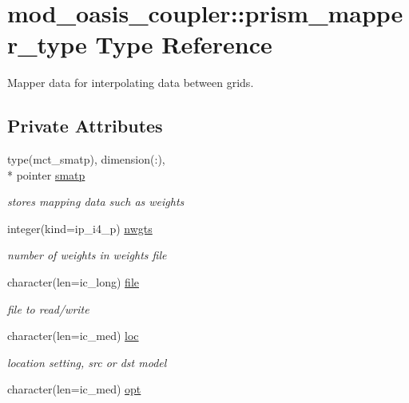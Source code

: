 \hypertarget{structmod__oasis__coupler_1_1prism__mapper__type}{\section{mod\+\_\+oasis\+\_\+coupler\+:\+:prism\+\_\+mapper\+\_\+type Type Reference}
\label{structmod__oasis__coupler_1_1prism__mapper__type}
}


Mapper data for interpolating data between grids.  


\subsection*{Private Attributes}
\begin{DoxyCompactItemize}
\item 
type(mct\+\_\+smatp), dimension(\+:), \\*
pointer \hyperlink{structmod__oasis__coupler_1_1prism__mapper__type_a3dc23fe2df63b9bbf759a2d06645c27e}{smatp}
\begin{DoxyCompactList}\small\item\em stores mapping data such as weights \end{DoxyCompactList}\item 
integer(kind=ip\+\_\+i4\+\_\+p) \hyperlink{structmod__oasis__coupler_1_1prism__mapper__type_a8ea719b8aa4ce4bfed630471b4d3687a}{nwgts}
\begin{DoxyCompactList}\small\item\em number of weights in weights file \end{DoxyCompactList}\item 
character(len=ic\+\_\+long) \hyperlink{structmod__oasis__coupler_1_1prism__mapper__type_a4994b8d9101eac292d85a5e0447cdeec}{file}
\begin{DoxyCompactList}\small\item\em file to read/write \end{DoxyCompactList}\item 
character(len=ic\+\_\+med) \hyperlink{structmod__oasis__coupler_1_1prism__mapper__type_a23c2df7387be68804d75095c47e59b69}{loc}
\begin{DoxyCompactList}\small\item\em location setting, src or dst model \end{DoxyCompactList}\item 
character(len=ic\+\_\+med) \hyperlink{structmod__oasis__coupler_1_1prism__mapper__type_aefa2ea5f38fd443b21f78911dfba3909}{opt}

\end{DoxyCompactItemize}
